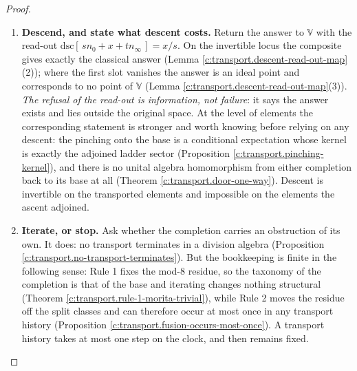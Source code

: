 \documentclass[11pt]{article}
\theoremstyle{definition}
\theoremstyle{plain}
\providecommand{\dsc}{}\renewcommand{\dsc}{\mathrm{dsc}}
\providecommand{\nInf}{}\renewcommand{\nInf}{n_\infty}
\providecommand{\nO}{}\renewcommand{\nO}{n_0}
\begin{document}
\begin{proof}
\begin{enumerate}
\item[\textbf{Step 5.}] \textbf{Descend, and state what descent costs.} Return the answer to $\mathbb{V}$ with the read-out $\dsc[\,s\nO + x + t\nInf\,] = x/s$. On the invertible locus the composite gives exactly the classical answer (Lemma \ref{c:transport.descent-read-out-map}(2)); where the first slot vanishes the answer is an ideal point and corresponds to no point of $\mathbb{V}$ (Lemma \ref{c:transport.descent-read-out-map}(3)). \emph{The refusal of the read-out is information, not failure}: it says the answer exists and lies outside the original space. At the level of elements the corresponding statement is stronger and worth knowing before relying on any descent: the pinching onto the base is a conditional expectation whose kernel is exactly the adjoined ladder sector (Proposition \ref{c:transport.pinching-kernel}), and there is no unital algebra homomorphism from either completion back to its base at all (Theorem \ref{c:transport.door-one-way}). Descent is invertible on the transported elements and impossible on the elements the ascent adjoined.

\item[\textbf{Step 6.}] \textbf{Iterate, or stop.} Ask whether the completion carries an obstruction of its own. It does: no transport terminates in a division algebra (Proposition \ref{c:transport.no-transport-terminates}). But the bookkeeping is finite in the following sense: Rule 1 fixes the mod-8 residue, so the taxonomy of the completion is that of the base and iterating changes nothing structural (Theorem \ref{c:transport.rule-1-morita-trivial}), while Rule 2 moves the residue off the split classes and can therefore occur at most once in any transport history (Proposition \ref{c:transport.fusion-occurs-most-once}). A transport history takes at most one step on the clock, and then remains fixed.
\end{enumerate}

\end{proof}
\end{document}
